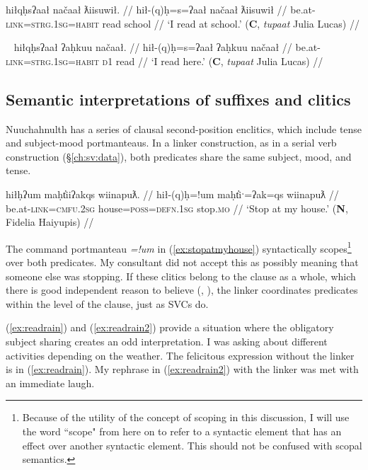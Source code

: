 \ex \label{ex:readatschool}
\begingl
\glpreamble hiłqḥsʔaał načaał ƛiisuwił. //
\gla hił-(q)ḥ=s=ʔaał načaał ƛiisuwił //
\glb be.at-\textsc{link}=\textsc{strg.1sg}=\textsc{habit} read school //
\glft `I read at school.' (\textbf{C}, \textit{tupaat} Julia Lucas) //
\endgl
\xe

\ex~ \label{ex:readatschool}
\begingl
\glpreamble hiłqḥsʔaał ʔaḥkuu načaał. //
\gla hił-(q)ḥ=s=ʔaał ʔaḥkuu načaał //
\glb be.at-\textsc{link}=\textsc{strg.1sg}=\textsc{habit} \textsc{d1} read //
\glft `I read here.' (\textbf{C}, \textit{tupaat} Julia Lucas) //
\endgl
\xe

\subsection{Semantic interpretations of suffixes and clitics} \label{ch:link:second}

Nuuchahnulth has a series of clausal second-position enclitics, which include tense and subject-mood portmanteaus. In a linker construction, as in a serial verb construction (\S\ref{ch:sv:data}), both predicates share the same subject, mood, and tense.

\ex \label{ex:stopatmyhouse}
\begingl
\glpreamble hiłḥʔum maḥt̓iiʔakqs wiinapuƛ. //
\gla hił-(q)ḥ=!um maḥt̓iˑ=ʔak=qs wiinapuƛ //
\glb be.at-\textsc{link}=\textsc{cmfu.2sg} house=\textsc{poss}=\textsc{defn.1sg} stop.\textsc{mo} //
\glft `Stop at my house.' (\textbf{N}, Fidelia Haiyupis) //
\endgl
\xe

The command portmanteau \textit{=!um} in (\ref{ex:stopatmyhouse}) syntactically scopes\footnote{Because of the utility of the concept of scoping in this discussion, I will use the word ``scope" from here on to refer to a syntactic element that has an effect over another syntactic element. This should not be confused with scopal semantics.} over both predicates. My consultant did not accept this as possibly meaning that someone else was stopping. If these clitics belong to the clause as a whole, which there is good independent reason to believe (\citealt[35--36]{rose1981}, \citealt[42--50]{woo2007b}), the linker coordinates predicates within the level of the clause, just as SVCs do.

(\ref{ex:readrain}) and (\ref{ex:readrain2}) provide a situation where the obligatory subject sharing creates an odd interpretation. I was asking about different activities depending on the weather. The felicitous expression without the linker is in (\ref{ex:readrain}). My rephrase in (\ref{ex:readrain2}) with the linker was met with an immediate laugh.

